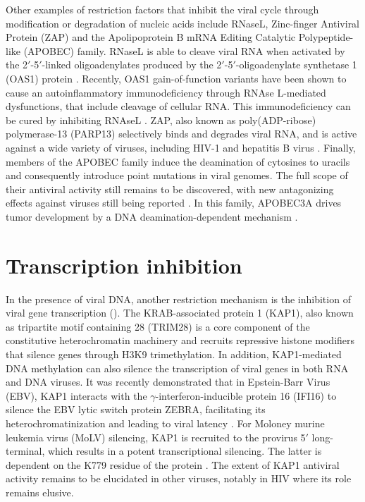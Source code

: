 \documentclass{enslyonreview}
\begin{document}
Other examples of restriction factors that inhibit the viral cycle through modification or
degradation of nucleic acids include RNaseL, Zinc-finger Antiviral Protein (ZAP) and the
Apolipoprotein B mRNA Editing Catalytic Polypeptide-like (APOBEC) family. RNaseL is able to
cleave viral RNA when activated by the 2$'$-5$'$-linked oligoadenylates produced by the
2$'$-5$'$-oligoadenylate synthetase 1 (OAS1) protein \cite{klugeSnapShotAntiviralRestriction2015}. Recently, OAS1
gain-of-function variants have been shown to cause an autoinflammatory immunodeficiency
through RNAse L-mediated dysfunctions, that include cleavage of cellular RNA. This
immunodeficiency can be cured by inhibiting RNAseL \cite{maggHeterozygousOAS1Gainoffunction2021}. ZAP, also known as
poly(ADP-ribose) polymerase-13 (PARP13) selectively binds and degrades viral RNA, and is
active against a wide variety of viruses, including HIV-1 and hepatitis B virus
\cite{shaoVersatilityZincFingerAntiviral2024}. Finally, members of the APOBEC family induce the deamination of cytosines to
uracils and consequently introduce point mutations in viral genomes. The full scope of their
antiviral activity still remains to be discovered, with new antagonizing effects against
viruses still being reported \cite{gottigApobec3ADeaminationFunctions2023}. In this family, APOBEC3A drives tumor
development by a DNA deamination-dependent mechanism \cite{naumannDNADeaminationRequired2023}.

\section{Transcription inhibition}

In the presence of viral DNA, another restriction mechanism is the inhibition of viral gene
transcription (). The KRAB-associated protein 1 (KAP1), also known as
tripartite motif containing 28 (TRIM28) is a core component of the constitutive
heterochromatin machinery and recruits repressive histone modifiers that silence genes
through H3K9 trimethylation. In addition, KAP1-mediated DNA methylation can also silence the
transcription of viral genes in both RNA and DNA viruses. It was recently demonstrated that
in Epstein-Barr Virus (EBV), KAP1 interacts with the $\gamma$-interferon-inducible protein 16
(IFI16) to silence the EBV lytic switch protein ZEBRA, facilitating its heterochromatinization
and leading to viral latency \cite{xuIFI16PartnersKAP12022}. For Moloney murine leukemia virus (MoLV)
silencing, KAP1 is recruited to the provirus 5$'$ long-terminal, which results in a potent
transcriptional silencing. The latter is dependent on the K779 residue of the protein
\cite{leeCharacterizationInteractionTrim282018}. The extent of KAP1 antiviral activity remains to be elucidated in other
viruses, notably in HIV where its role remains elusive.
\end{document}
